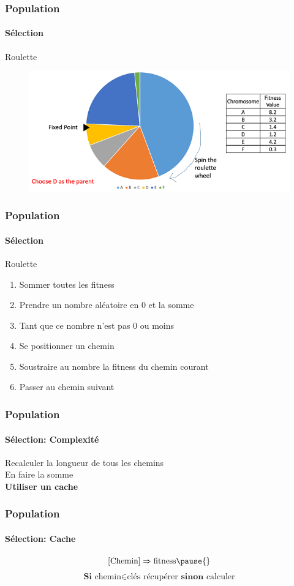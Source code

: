 \documentclass[16pt]{beamer}
\begin{document}
\begin{frame}
  \frametitle{Population}
  \framesubtitle{Sélection}
  \centering
  Roulette \pause{}
  \begin{figure}
    \includegraphics[scale=0.6]{roulette.jpg}
  \end{figure}
\end{frame}

\begin{frame}
  \frametitle{Population}
  \framesubtitle{Sélection}
  \centering
  Roulette
  \begin{enumerate}
    \item Sommer toutes les fitness
    \item Prendre un nombre aléatoire en 0 et la somme
    \item Tant que ce nombre n'est pas 0 ou moins 
    \item Se positionner un chemin
    \item Soustraire au nombre la fitness du chemin courant
    \item Passer au chemin suivant
  \end{enumerate}
\end{frame}

\begin{frame}
  \frametitle{Population}
  \framesubtitle{Sélection: Complexité}
  Recalculer la longueur de tous les chemins \\
  En faire la somme \\ \pause{}
  \textbf{Utiliser un cache}
\end{frame}

\begin{frame}[fragile]
  \frametitle{Population}
  \framesubtitle{Sélection: Cache}
  \[
    [\text{Chemin}] \Rightarrow \text{fitness} \pause{}
  \]
  \[
   \textbf{Si } \text{chemin} \in \text{clés} \text{ récupérer } \textbf{sinon} \text{ calculer}
  \]
\end{frame}
\end{document}
